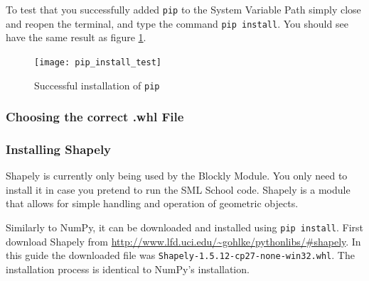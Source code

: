To test that you successfully added \texttt{pip} to the System Variable Path simply close and reopen the terminal, and type the command \texttt{pip install}. You should see have the same result as figure \ref{fig:pip_install_test}.

\begin{figure}[h!]
  \centering
    \texttt{[image: pip\_install\_test]}
    \caption{Successful installation of \texttt{pip} \label{fig:pip_install_test} } 
\end{figure}

\subsubsection{Choosing the correct .whl File}
\label{subsubsec:choosin_whl_file}

\subsubsection{Installing Shapely}
\label{subsubsec:installing_shapely}

Shapely is currently only being used by the Blockly Module. You only need to install it in case you pretend to run the SML School code. Shapely is a module that allows for simple handling and operation of geometric objects.

Similarly to NumPy, it can be downloaded and installed using \texttt{pip install}. First download Shapely from \url{http://www.lfd.uci.edu/~gohlke/pythonlibs/#shapely}. In this guide the downloaded file was \texttt{Shapely-1.5.12-cp27-none-win32.whl}. The installation process is identical to NumPy's installation. 
